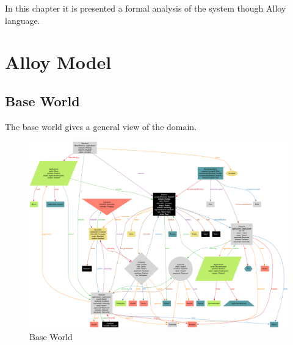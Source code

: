 In this chapter it is presented a formal analysis of the system though Alloy language.

\section{Alloy Model}


\subsection{Base World}
The base world gives a general view of the domain.

\begin{figure}[h]
    \centering
    \includegraphics[width=16cm]{images/alloy/BaseWorld.png}
    \caption{Base World}
\end{figure}
